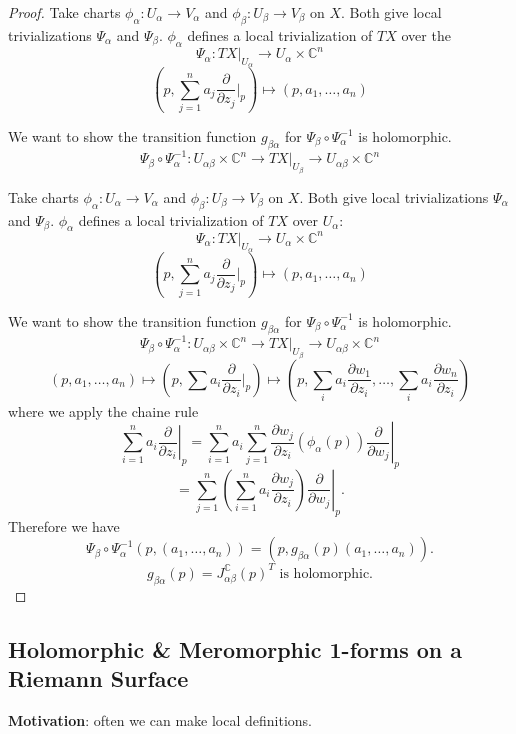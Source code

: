 \documentclass{article}
\begin{document}
\begin{proof}
Take charts $\phi_\alpha: U_\alpha \to V_\alpha$ and $\phi_\beta: U_\beta \to V_\beta$ on $X$.
Both give local trivializations $\Psi_\alpha$ and $\Psi_\beta$.
$\phi_\alpha$ defines a local trivialization of $TX$ over the
$$\Psi_\alpha: TX|_{U_\alpha} \to U_\alpha \times \mathbb{C}^n$$
$$(p, \sum_{j=1}^n a_j \frac{\partial}{\partial z_j}|_p) \mapsto (p, a_1, \dots, a_n)$$

We want to show the transition function $g_{\beta \alpha}$ for $\Psi_\beta \circ \Psi_\alpha^{-1}$ is holomorphic.
$$\Psi_\beta \circ \Psi_\alpha^{-1}: U_{\alpha \beta} \times \mathbb{C}^n \to T X|_{U_\beta} \to U_{\alpha \beta} \times \mathbb{C}^n$$

Take charts $\phi_\alpha: U_\alpha \to V_\alpha$ and $\phi_\beta: U_\beta \to V_\beta$ on $X$.
Both give local trivializations $\Psi_\alpha$ and $\Psi_\beta$.
$\phi_\alpha$ defines a local trivialization of $TX$ over $U_\alpha$:
$$\Psi_\alpha: TX|_{U_\alpha} \to U_\alpha \times \mathbb{C}^n$$
$$(p, \sum_{j=1}^n a_j \frac{\partial}{\partial z_j}|_p) \mapsto (p, a_1, \dots, a_n)$$

We want to show the transition function $g_{\beta \alpha}$ for $\Psi_\beta \circ \Psi_\alpha^{-1}$ is holomorphic.
$$\Psi_\beta \circ \Psi_\alpha^{-1}: U_{\alpha \beta} \times \mathbb{C}^n \to T X|_{U_\beta} \to U_{\alpha \beta} \times \mathbb{C}^n$$
$$(p, a_1, \dots, a_n) \mapsto (p, \sum a_i \frac{\partial}{\partial z_i}|_p) \mapsto (p, \sum_i a_i \frac{\partial w_1}{\partial z_i}, \dots, \sum_i a_i \frac{\partial w_n}{\partial z_i})$$
where we apply the chaine rule
$$\sum_{i=1}^n a_i \left. \frac{\partial}{\partial z_i} \right|_p = \sum_{i=1}^n a_i \sum_{j=1}^n \frac{\partial w_j}{\partial z_i}(\phi_\alpha(p)) \left. \frac{\partial}{\partial w_j} \right|_p$$
$$= \sum_{j=1}^n \left( \sum_{i=1}^n a_i \frac{\partial w_j}{\partial z_i} \right) \left. \frac{\partial}{\partial w_j} \right|_p.$$
Therefore we have
$$\Psi_\beta \circ \Psi_\alpha^{-1}(p, (a_1, \dots, a_n)) = (p, g_{\beta \alpha}(p) (a_1, \dots, a_n)).$$
$$g_{\beta \alpha}(p) = J_{\alpha \beta}^{\mathbb{C}}(p)^T \text{ is holomorphic.}$$
\end{proof}

\subsection{Holomorphic \& Meromorphic 1-forms on a Riemann Surface}

\textbf{Motivation}: often we can make local definitions.
\end{document}
